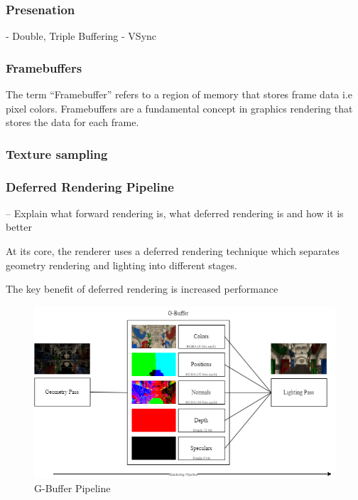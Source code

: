 \documentclass[11pt]{article}
\begin{document}
\subsubsection{Presenation}

- Double, Triple Buffering
- VSync

\subsubsection{Framebuffers}
The term ``Framebuffer'' refers to a region of memory that stores frame data i.e pixel colors.
Framebuffers are a fundamental concept in graphics rendering that stores the data for each frame.

\subsubsection{Texture sampling}

\subsubsection{Deferred Rendering Pipeline}

-- Explain what forward rendering is, what deferred rendering is and how it is better

At its core, the renderer uses a deferred rendering technique which separates geometry rendering and
lighting into different stages. 

The key benefit of deferred rendering is increased performance 

\begin{figure}[h!]
  \centering
  \includegraphics[width=\textwidth]{images/g_buffer.png}
  \caption{G-Buffer Pipeline}
  \label{fig:g_buffer}
\end{figure}
\end{document}
